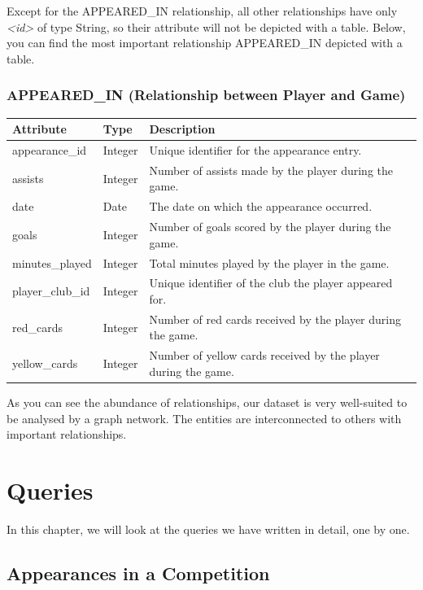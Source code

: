 \documentclass{Configuration_Files/PoliMi3i_thesis}
\begin{document}
Except for the APPEARED\_IN relationship, all other relationships have only \textit{<id>} of type String, so their attribute will not be depicted with a table. Below, you can find the most important relationship APPEARED\_IN depicted with a table.

\subsection*{APPEARED\_IN (Relationship between Player and Game)}
\begin{longtable}{|p{4cm}|p{3cm}|p{8cm}|}
\hline
\textbf{Attribute} & \textbf{Type} & \textbf{Description} \\
\hline
\endhead
appearance\_id & Integer & Unique identifier for the appearance entry. \\
assists & Integer & Number of assists made by the player during the game. \\
date & Date & The date on which the appearance occurred. \\
goals & Integer & Number of goals scored by the player during the game. \\
minutes\_played & Integer & Total minutes played by the player in the game. \\
player\_club\_id & Integer & Unique identifier of the club the player appeared for. \\
red\_cards & Integer & Number of red cards received by the player during the game. \\
yellow\_cards & Integer & Number of yellow cards received by the player during the game. \\
\hline
\end{longtable}

As you can see the abundance of relationships, our dataset is very well-suited to be analysed by a graph network. The entities are interconnected to others with important relationships.




\chapter{Queries}

In this chapter, we will look at the queries we have written in detail, one by one. 

\section{Appearances in a Competition}
\end{document}
